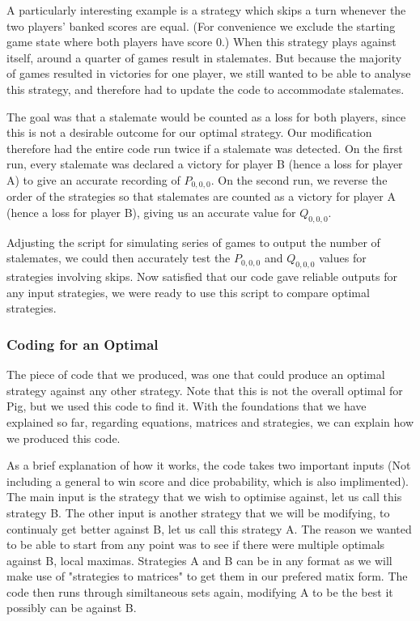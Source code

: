 \documentclass[a4paper,titlepage]{article}
\begin{document}
A particularly interesting example is a strategy which skips a turn whenever the two players' banked scores are equal. (For convenience we exclude the starting game state where both players have score 0.) When this strategy plays against itself, around a quarter of games result in stalemates. But because the majority of games resulted in victories for one player, we still wanted to be able to analyse this strategy, and therefore had to update the code to accommodate stalemates.

The goal was that a stalemate would be counted as a loss for both players, since this is not a desirable outcome for our optimal strategy. Our modification therefore had the entire code run twice if a stalemate was detected. On the first run, every stalemate was declared a victory for player B (hence a loss for player A) to give an accurate recording of $P_{0,0,0}$. On the second run, we reverse the order of the strategies so that stalemates are counted as a victory for player A (hence a loss for player B), giving us an accurate value for $Q_{0,0,0}$.

Adjusting the script for simulating series of games to output the number of stalemates, we could then accurately test the $P_{0,0,0}$ and $Q_{0,0,0}$ values for strategies involving skips. Now satisfied that our code gave reliable outputs for any input strategies, we were ready to use this script to compare optimal strategies.

\subsubsection{Coding for an Optimal}

The piece of code that we produced, was one that could produce an optimal strategy against any other strategy. Note that this is not the overall optimal for Pig, but we used this code to find it. With the foundations that we have explained so far, regarding equations, matrices and strategies, we can explain how we produced this code.

As a brief explanation of how it works, the code takes two important inputs (Not including a general to win score and dice probability, which is also implimented). The main input is the strategy that we wish to optimise against, let us call this strategy B. The other input is another strategy that we will be modifying, to continualy get better against B, let us call this strategy A. The reason we wanted to be able to start from any point was to see if there were multiple optimals against B, local maximas. Strategies A and B can be in any format as we will make use of "strategies to matrices" to get them in our prefered matix form. The code then runs through similtaneous sets again, modifying A to be the best it possibly can be against B.
\end{document}
